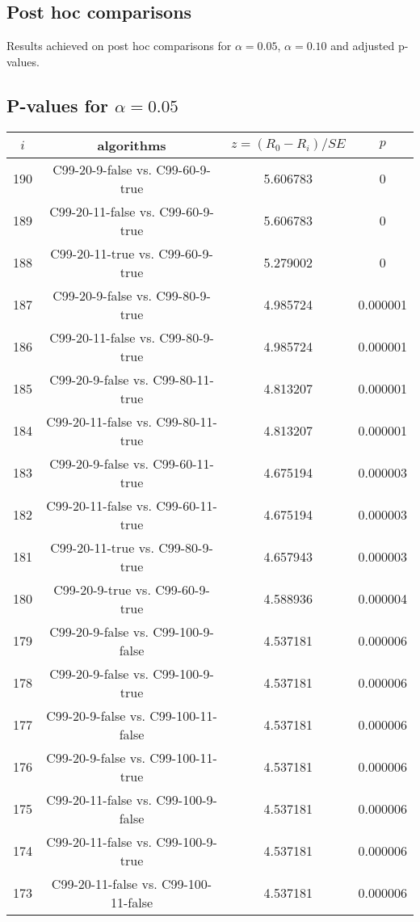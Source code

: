 \documentclass[a4paper,10pt]{article}
\begin{document}
\begin{landscape}
\pagebreak

\section{Post hoc comparisons}

Results achieved on post hoc comparisons for $\alpha = 0.05$, $\alpha = 0.10$ and adjusted p-values.

\subsection{P-values for $\alpha=0.05$}

\begin{table}[!htp]
\centering\scriptsize
\begin{tabular}{cccc}
$i$&algorithms&$z=(R_0 - R_i)/SE$&$p$\\
\hline190&C99-20-9-false vs. C99-60-9-true&5.606783&0\\
189&C99-20-11-false vs. C99-60-9-true&5.606783&0\\
188&C99-20-11-true vs. C99-60-9-true&5.279002&0\\
187&C99-20-9-false vs. C99-80-9-true&4.985724&0.000001\\
186&C99-20-11-false vs. C99-80-9-true&4.985724&0.000001\\
185&C99-20-9-false vs. C99-80-11-true&4.813207&0.000001\\
184&C99-20-11-false vs. C99-80-11-true&4.813207&0.000001\\
183&C99-20-9-false vs. C99-60-11-true&4.675194&0.000003\\
182&C99-20-11-false vs. C99-60-11-true&4.675194&0.000003\\
181&C99-20-11-true vs. C99-80-9-true&4.657943&0.000003\\
180&C99-20-9-true vs. C99-60-9-true&4.588936&0.000004\\
179&C99-20-9-false vs. C99-100-9-false&4.537181&0.000006\\
178&C99-20-9-false vs. C99-100-9-true&4.537181&0.000006\\
177&C99-20-9-false vs. C99-100-11-false&4.537181&0.000006\\
176&C99-20-9-false vs. C99-100-11-true&4.537181&0.000006\\
175&C99-20-11-false vs. C99-100-9-false&4.537181&0.000006\\
174&C99-20-11-false vs. C99-100-9-true&4.537181&0.000006\\
173&C99-20-11-false vs. C99-100-11-false&4.537181&0.000006\\

\end{tabular}
\end{table}
\end{landscape}
\end{document}
